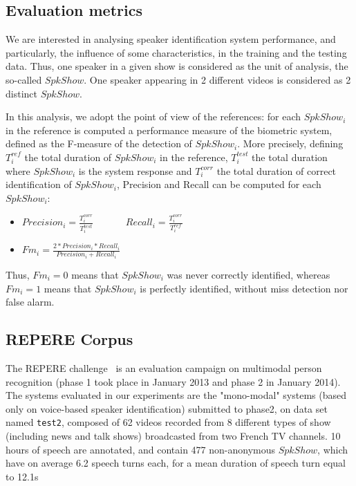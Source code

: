 
\subsection{Evaluation metrics}
\vspace*{-0.1cm}
We are interested in analysing speaker identification system performance, and particularly, the influence of some characteristics, in the training and the testing data. Thus, one speaker in a given show is considered as the unit of analysis, the so-called $SpkShow$. One speaker appearing in 2 different videos is considered as 2 distinct $SpkShow$. 

In this analysis, we adopt the point of view of the references: for each $SpkShow_i$ in the reference is computed a performance measure of the biometric system, defined as the F-measure of the detection of $SpkShow_i$. More precisely, defining $T^{ref}_i$ the total duration of $SpkShow_i$ in the reference, $T^{test}_i$ the total duration where $SpkShow_i$ is the system response and $T^{corr}_i$ the total duration of correct identification of $SpkShow_i$, Precision and Recall can be computed for each $SpkShow_i$:
\begin{itemize}
\item $Precision_i=\frac{T^{corr}_i}{T^{test}_i}$ ~~~~~~$Recall_i=\frac{T^{corr}_i}{T^{ref}_i}$
\item $Fm_i=\frac{2*Precision_i*Recall_i}{Precision_i+Recall_i}$
\end{itemize} 

Thus, $Fm_i=0$ means that $SpkShow_i$ was never correctly identified, whereas $Fm_i=1$ means that $SpkShow_i$ is perfectly identified, without miss detection nor false alarm.

\subsection{REPERE Corpus~\cite{Giraudel2012}}

The REPERE challenge~\cite{KAHN--CBMI--2012} is an evaluation campaign on multimodal person recognition (phase 1 took place in January 2013 and phase 2 in January 2014).  The systems evaluated in our experiments are the "mono-modal" systems (based only on voice-based speaker identification) submitted to phase2, on data set named \texttt{test2}, composed of 62 videos recorded from 8 different types of show (including news and talk shows) broadcasted from two French TV channels. 10 hours of speech are annotated, and contain 477 non-anonymous $SpkShow$, which have on average 6.2 speech turns each, for a mean duration of speech turn equal to 12.1s



